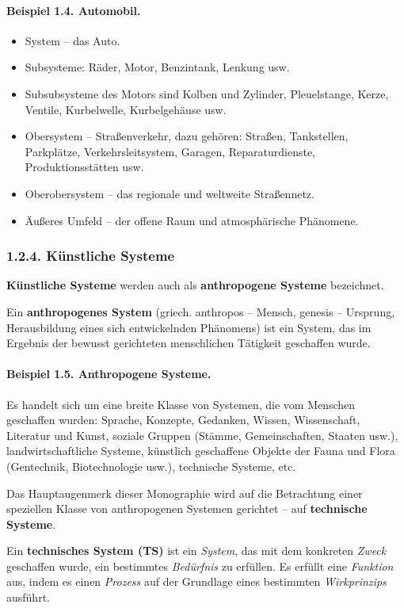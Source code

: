 \documentclass[11pt,a4paper]{article}
\begin{document}
\paragraph{Beispiel 1.4. Automobil.}
\begin{itemize}[noitemsep]
\item System -- das Auto.
\item Subsysteme: Räder, Motor, Benzintank, Lenkung usw.
\item Subsubsysteme des Motors sind Kolben und Zylinder, Pleuelstange, Kerze,
  Ventile, Kurbelwelle, Kurbelgehäuse usw.
\item Obersystem -- Straßenverkehr, dazu gehören: Straßen, Tankstellen,
  Parkplätze, Verkehrsleitsystem, Garagen, Reparaturdienste,
  Produktionsstätten usw.
\item Oberobersystem -- das regionale und weltweite Straßennetz.
\item Äußeres Umfeld -- der offene Raum und atmosphärische Phänomene.
\end{itemize}

\subsubsection*{1.2.4. Künstliche Systeme}

\textbf{Künstliche Systeme} werden auch als \textbf{anthropogene Systeme}
bezeichnet.

Ein \textbf{anthropogenes System} (griech. anthropos -- Mensch, genesis --
Ursprung, Herausbildung eines sich entwickelnden Phänomens) ist ein System,
das im Ergebnis der bewusst gerichteten menschlichen Tätigkeit geschaffen
wurde.

\paragraph{Beispiel 1.5. Anthropogene Systeme.}
Es handelt sich um eine breite Klasse von Systemen, die vom Menschen
geschaffen wurden: Sprache, Konzepte, Gedanken, Wissen, Wissenschaft,
Literatur und Kunst, soziale Gruppen (Stämme, Gemeinschaften, Staaten usw.),
landwirtschaftliche Systeme, künstlich geschaffene Objekte der Fauna und Flora
(Gentechnik, Biotechnologie usw.), technische Systeme, etc.

Das Hauptaugenmerk dieser Monographie wird auf die Betrachtung einer
speziellen Klasse von anthropogenen Systemen gerichtet -- auf
\textbf{technische Systeme}.

Ein \textbf{technisches System (TS)} ist ein \emph{System}, das mit dem
konkreten \emph{Zweck} geschaffen wurde, ein bestimmtes \emph{Bedürfnis} zu
erfüllen. Es erfüllt eine \emph{Funktion} aus, indem es einen \emph{Prozess}
auf der Grundlage eines bestimmten \emph{Wirkprinzips} ausführt.
\end{document}
